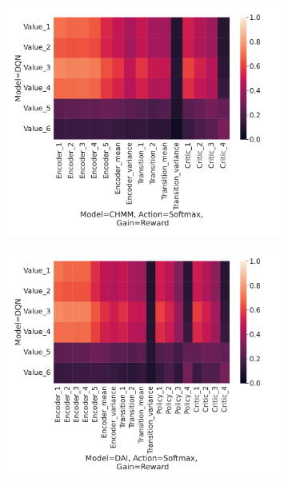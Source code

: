 \documentclass[twoside,11pt]{article}
\begin{document}
\begin{figure}[ht!]
    \centering
    \begin{subfigure}{.3\textwidth}
        \centering
        \includegraphics[draft=false,width=\linewidth]{cka_figures/CKA_dqn_1_chmm_109}
        \caption{}\label{sfig:cka-dqn-chmm}
    \end{subfigure}%
    \begin{subfigure}{.3\textwidth}
        \centering
        \includegraphics[draft=false,width=\linewidth]{cka_figures/CKA_dqn_1_dai_145}
        \caption{}\label{sfig:cka-dqn-dai}

\end{subfigure}
\end{figure}
\end{document}
